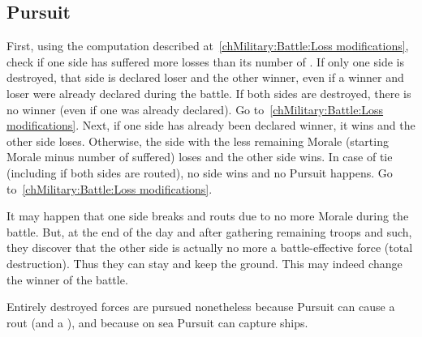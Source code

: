 \subsection{Pursuit}
\label{chMilitary:Battle:Pursuit}

\bparag First, using the computation described at~\ref{chMilitary:Battle:Loss
  modifications}, check if one side has suffered more losses than its number
of \LD.
\bparag If only one side is destroyed, that side is declared loser and the
other winner, even if a winner and loser were already declared during the
battle.
\bparag If both sides are destroyed, there is no winner (even if one was
already declared). Go to~\ref{chMilitary:Battle:Loss modifications}.
\bparag Next, if one side has already been declared winner, it wins and the
other side loses.
\bparag Otherwise, the side with the less remaining Morale (starting Morale
minus number of \textetoile suffered) loses and the other side wins.
\bparag In case of tie (including if both sides are routed), no side wins and
no Pursuit happens. Go to~\ref{chMilitary:Battle:Loss modifications}.

\begin{designnote}[Destruction]
  It may happen that one side breaks and routs due to no more Morale during
  the battle. But, at the end of the day and after gathering remaining troops
  and such, they discover that the other side is actually no more a
  battle-effective force (total destruction). Thus they can stay and keep the
  ground. This may indeed change the winner of the battle.

  Entirely destroyed forces are pursued nonetheless because Pursuit can cause
  a rout (and a ), and because on sea Pursuit can capture
  ships.
\end{designnote}

